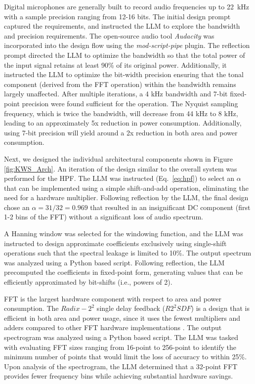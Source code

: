 Digital microphones are generally built to record audio frequencies up to 22~kHz with a sample precision ranging from 12-16 bits. The initial design prompt captured the requirements, and instructed the LLM to explore the bandwidth and precision requirements. The open-source audio tool \textit{Audacity} was incorporated into the design flow using the \textit{ mod-script-pipe} plugin. The reflection prompt directed the LLM to optimize the bandwidth so that the total power of the input signal retains at least 90\% of its original power. Additionally, it instructed the LLM to optimize the bit-width precision ensuring that the tonal component (derived from the FFT operation) within the bandwidth remains largely unaffected.
 After multiple iterations, a 4 kHz bandwidth and 7-bit fixed-point precision were found sufficient for the operation. The Nyquist sampling frequency, which is twice the bandwidth, will decrease from 44 kHz to 8 kHz, leading to an approximately 5x reduction in power consumption. Additionally, using 7-bit precision will yield around a 2x reduction in both area and power consumption.

Next, we designed the individual architectural components shown in Figure \ref{fig:KWS_Arch}. An iteration of the design similar to the overall system was performed for the HPF. The LLM was instructed (Eq.~\ref{eq:hpf}) to select an $\alpha$ that can be implemented using a simple shift-and-add operation, eliminating the need for a hardware multiplier. Following reflection by the LLM, the final design chose an $\alpha = 31/32 = 0.969$ that resulted in an insignificant DC component (first 1-2 bins of the FFT) without a significant loss of audio spectrum. 

A Hanning window was selected for the windowing function, and the LLM was instructed to design approximate coefficients exclusively using single-shift operations such that the spectral leakage is limited to 10\%. The output spectrum was analyzed using a Python based script. Following reflection, the LLM precomputed the coefficients in fixed-point form, generating values that can be efficiently approximated by bit-shifts (i.e., powers of 2).

FFT is the largest hardware component with respect to area and power consumption. The $Radix-2^2$ single delay feedback ($R2^2SDF$) is a design that is efficient in both area and power usage, since it uses the fewest multipliers and adders compared to other FFT hardware implementations \cite{chong20220}. The output spectrogram was analyzed using a Python based script. The LLM was tasked with evaluating FFT sizes ranging from 16-point to 256-point to identify the minimum number of points that would limit the loss of accuracy to within 25\%. Upon analysis of the spectrogram, the LLM determined that a 32-point FFT provides fewer frequency bins while achieving substantial hardware savings.

